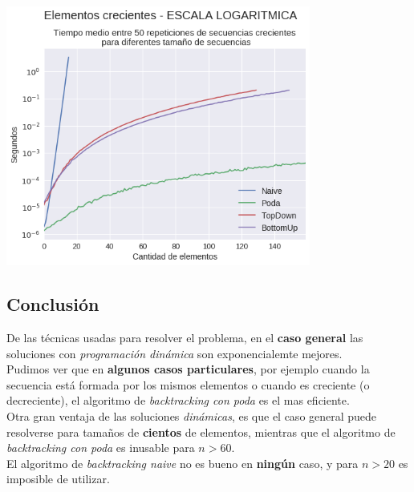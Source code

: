 {\centering
  \includegraphics[width=0.75\textwidth]{informe/img/experimentos/todos-creciente-logaritmica.png} \\
}

\subsection{Conclusión}

De las técnicas usadas para resolver el problema, en el \textbf{caso general} las soluciones con \textit{programación dinámica} son exponencialemte mejores. \\

Pudimos ver que en \textbf{algunos casos particulares}, por ejemplo cuando la secuencia está formada por los mismos elementos o cuando es creciente (o decreciente), el algoritmo de \textit{backtracking con poda} es el mas eficiente.  \\

Otra gran ventaja de las soluciones \textit{dinámicas}, es que el caso general puede resolverse para tamaños de \textbf{cientos} de elementos, mientras que el algoritmo de \textit{backtracking con poda} es inusable para $n > 60$.  \\

El algoritmo de \textit{backtracking naive} no es bueno en \textbf{ningún} caso, y para $n > 20$ es imposible de utilizar. \\